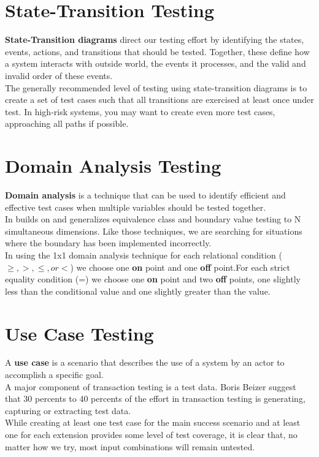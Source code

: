 \documentclass{article}
\begin{document}
\section*{State-Transition Testing}
\textbf{State-Transition diagrams} direct our testing effort by identifying the states, events, actions, and transitions that should be tested. Together, these define how a system interacts with outside world, the events it processes, and the valid and invalid order of these events.
\\
The generally recommended level of testing using state-transition diagrams is to create a set of test cases such that all transitions are exercised at least once under test. In high-risk systems, you may want to create even more test cases, approaching all paths if possible.

\section*{Domain Analysis Testing}
\textbf{Domain analysis} is a technique that can be used to identify efficient and effective test cases when multiple variables should be tested together.
\\
In builds on and generalizes equivalence class and boundary value testing to N simultaneous dimensions. Like those techniques, we are searching for situations where the boundary has been implemented incorrectly.
\\
In using the 1x1 domain analysis technique for each relational condition ($\geq, >, \leq, or <$) we choose one \textbf{on} point and one \textbf{off} point.For each strict equality condition (=) we choose one \textbf{on} point and two \textbf{off} points, one slightly less than the conditional value and one slightly greater than the value.

\section*{Use Case Testing}
A \textbf{use case} is a scenario that describes the use of a system by an actor to accomplish a specific goal.
\\
A major component of transaction testing is a test data. Boris Beizer suggest that 30 percents to 40 percents of the effort in transaction testing is generating, capturing or extracting test data.
\\
While creating at least one test case for the main success scenario and at least one for each extension provides some level of test coverage, it is clear that, no matter how we try, most input combinations will remain untested.
\end{document}
